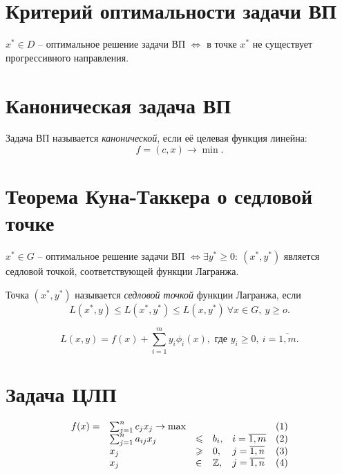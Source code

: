 \section{Критерий оптимальности задачи ВП}

\begin{theorem}
	$x^* \in D$ -- оптимальное решение задачи ВП $\iff $ в точке $x^*$ не существует прогрессивного направления.
\end{theorem}

\section{Каноническая задача ВП}

\begin{definition}
	Задача ВП называется \emph{канонической}, если её целевая функция линейна:
	\[
		f = (c,x) \rightarrow \min.
	\]
\end{definition}

\section{Теорема Куна-Таккера о седловой точке}

\begin{theorem}
	$x^* \in G$ -- оптимальное решение задачи ВП $\iff \exists y^* \geqslant 0: \ (x^*,y^*)$ является седловой точкой, соответствующей функции Лагранжа.
\end{theorem}

\begin{definition}
	Точка $(x^*,y^*)$ называется \emph{седловой точкой} функции Лагранжа, если
	\[
		L(x^*,y) \leqslant L(x^*,y^*) \leqslant L(x,y^*) \ \forall x \in G, \ y \geqslant o.
	\]
\end{definition}

\begin{definition}
	\[
		L(x,y) = f(x) + \sum_{i=1}^{m}y_i \phi_i(x), \text{ где }y_i \geqslant 0, \ i = \overline{1,m}.
	\]
\end{definition}

\section{Задача ЦЛП}

\[
	\begin{array}{lllllr}
		f(x) = & \sum_{j=1}^{n}c_jx_j \rightarrow \max &           &      &                    & (1) \\
		       & \sum_{j=1}^{n}a_{ij}x_j               & \leqslant & b_i, & i = \overline{1,m} & (2) \\
		       & x_j                                   & \geqslant & 0,   & j = \overline{1,n} & (3) \\
		       & x_j                                   & \in       & \mathbb{Z},  & j = \overline{1,n} & (4)
	\end{array}
\]


